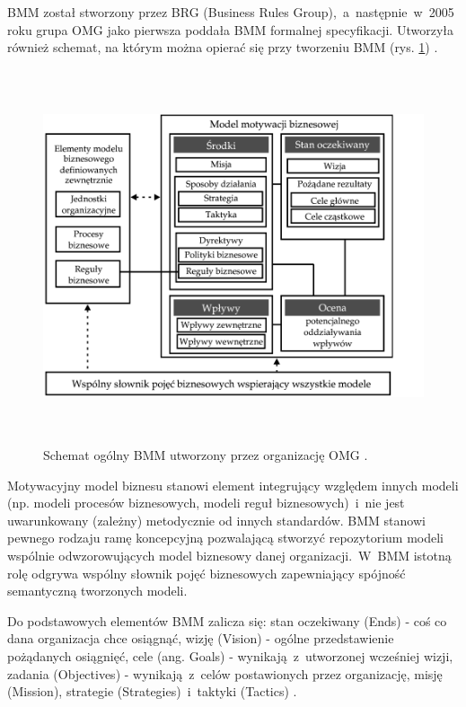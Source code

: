 BMM został stworzony przez BRG (Business Rules Group),~a~następnie~w~2005 roku grupa OMG jako pierwsza poddała BMM formalnej specyfikacji. Utworzyła również schemat, na którym można opierać się przy tworzeniu BMM (rys. \ref{BMM_schem}) \cite{AnaWesHal}.

\begin{figure}[h!tbp]
\begin{centering}
\includegraphics[width=12cm, height=11cm]{img/BMM_PL.png}
\caption[Schemat ogólny BMM utworzony przez organizację OMG.]{Schemat ogólny BMM utworzony przez organizację OMG \cite{BMMOmg}.}\label{BMM_schem}
\end{centering}
\end{figure}

Motywacyjny model biznesu stanowi element integrujący względem innych modeli (np. modeli procesów biznesowych, modeli reguł biznesowych)~i~nie jest uwarunkowany (zależny) metodycznie od innych standardów. BMM stanowi pewnego rodzaju ramę koncepcyjną pozwalającą stworzyć repozytorium modeli wspólnie odwzorowujących model biznesowy danej organizacji.~W~BMM istotną rolę odgrywa wspólny słownik pojęć biznesowych zapewniający spójność semantyczną tworzonych modeli.

Do podstawowych elementów BMM zalicza się: stan oczekiwany (Ends) - coś co dana organizacja chce osiągnąć, wizję (Vision) - ogólne przedstawienie pożądanych osiągnięć, cele (ang. Goals) - wynikają~z~utworzonej wcześniej wizji, zadania (Objectives) - wynikają~z~celów postawionych przez organizację, misję (Mission), strategie (Strategies)~i~taktyki (Tactics) \cite{AnaWesHal}. 

